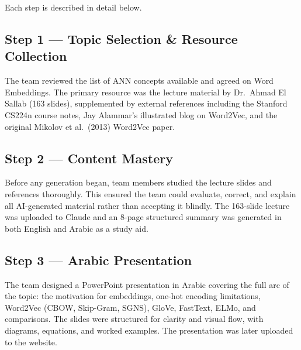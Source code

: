 Each step is described in detail below.

\subsection{Step 1 — Topic Selection \& Resource Collection}
The team reviewed the list of ANN concepts available and agreed on Word Embeddings. The primary resource was the lecture material by Dr.\ Ahmad El Sallab (163 slides), supplemented by external references including the Stanford CS224n course notes, Jay Alammar's illustrated blog on Word2Vec, and the original Mikolov et al.\ (2013) Word2Vec paper.

\subsection{Step 2 — Content Mastery}
Before any generation began, team members studied the lecture slides and references thoroughly. This ensured the team could evaluate, correct, and explain all AI-generated material rather than accepting it blindly. The 163-slide lecture was uploaded to Claude and an 8-page structured summary was generated in both English and Arabic as a study aid.

\subsection{Step 3 — Arabic Presentation}
The team designed a PowerPoint presentation in Arabic covering the full arc of the topic: the motivation for embeddings, one-hot encoding limitations, Word2Vec (CBOW, Skip-Gram, SGNS), GloVe, FastText, ELMo, and comparisons. The slides were structured for clarity and visual flow, with diagrams, equations, and worked examples. The presentation was later uploaded to the website.

